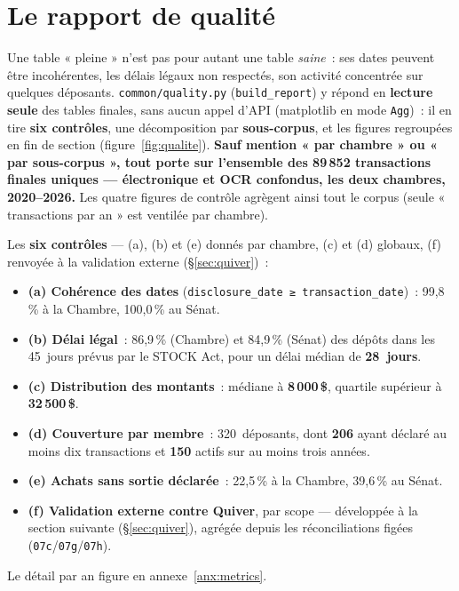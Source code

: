 \documentclass[11pt,a4paper]{article}
\newcommand{\co}[1]{\texttt{\small #1}}
\begin{document}
\section{Le rapport de qualité}
\label{sec:qualite}

Une table « pleine » n'est pas pour autant une table \emph{saine}~: ses dates peuvent être incohérentes,
les délais légaux non respectés, son activité concentrée sur quelques déposants. \co{common/quality.py}
(\co{build_report}) y répond en \textbf{lecture seule} des tables finales, sans aucun appel d'API
(matplotlib en mode \co{Agg})~: il en tire \textbf{six contrôles}, une décomposition par
\textbf{sous-corpus}, et les figures regroupées en fin de section (figure~\ref{fig:qualite}).
\textbf{Sauf mention « par chambre » ou « par sous-corpus », tout porte sur l'ensemble des 89\,852
transactions finales uniques — électronique et OCR confondus, les deux chambres, 2020--2026.} Les quatre figures
de contrôle agrègent ainsi tout le corpus (seule « transactions par an » est ventilée par chambre).

Les \textbf{six contrôles} — (a), (b) et (e) donnés par chambre, (c) et (d) globaux, (f) renvoyée à la
validation externe (§\ref{sec:quiver})~:
\begin{itemize}[nosep,leftmargin=1.5em]
\item \textbf{(a) Cohérence des dates} (\co{disclosure_date ≥ transaction_date})~: 99,8\,\% à la Chambre, 100,0\,\% au Sénat.
\item \textbf{(b) Délai légal}~: 86,9\,\% (Chambre) et 84,9\,\% (Sénat) des dépôts dans les 45~jours prévus par le STOCK Act, pour un délai médian de \textbf{28~jours}.
\item \textbf{(c) Distribution des montants}~: médiane à \textbf{8\,000\,\$}, quartile supérieur à \textbf{32\,500\,\$}.
\item \textbf{(d) Couverture par membre}~: 320~déposants, dont \textbf{206} ayant déclaré au moins dix transactions et \textbf{150} actifs sur au moins trois années.
\item \textbf{(e) Achats sans sortie déclarée}~: 22,5\,\% à la Chambre, 39,6\,\% au Sénat.
\item \textbf{(f) Validation externe contre Quiver}, par scope — développée à la section suivante (§\ref{sec:quiver}), agrégée depuis les réconciliations figées (\co{07c}/\co{07g}/\co{07h}).
\end{itemize}
Le détail par an figure en annexe~\ref{anx:metrics}.
\end{document}
